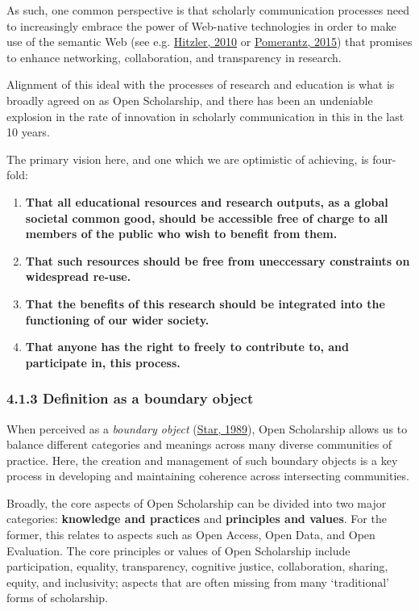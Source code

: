 As such, one common perspective is that scholarly communication
processes need to increasingly embrace the power of Web-native
technologies in order to make use of the semantic Web (see e.g.
\href{http://www.semantic-web-journal.net/content/reasonable-semantic-web}{Hitzler,
2010} or \href{https://mitpress.mit.edu/books/metadata}{Pomerantz,
2015}) that promises to enhance networking, collaboration, and
transparency in research.

Alignment of this ideal with the processes of research and education is
what is broadly agreed on as Open Scholarship, and there has been an
undeniable explosion in the rate of innovation in scholarly
communication in this in the last 10 years.

The primary vision here, and one which we are optimistic of achieving,
is four-fold:

\begin{enumerate}
\def\labelenumi{\arabic{enumi}.}
\item
  \textbf{That all educational resources and research outputs, as a
  global societal common good, should be accessible free of charge to
  all members of the public who wish to benefit from them.}
\item
  \textbf{That such resources should be free from uneccessary
  constraints on widespread re-use.}
\item
  \textbf{That the benefits of this research should be integrated into
  the functioning of our wider society.}
\item
  \textbf{That anyone has the right to freely to contribute to, and
  participate in, this process.}
\end{enumerate}

\subsubsection{4.1.3 Definition as a boundary
object}\label{definition-as-a-boundary-object}

When perceived as a \emph{boundary object}
(\href{http://www.lchc.ucsd.edu/MCA/Mail/xmcamail.2012_08.dir/pdfMrgHgzULhA.pdf}{Star,
1989}), Open Scholarship allows us to balance different categories and
meanings across many diverse communities of practice. Here, the creation
and management of such boundary objects is a key process in developing
and maintaining coherence across intersecting communities.

Broadly, the core aspects of Open Scholarship can be divided into two
major categories: \textbf{knowledge and practices} and
\textbf{principles and values}. For the former, this relates to aspects
such as Open Access, Open Data, and Open Evaluation. The core principles
or values of Open Scholarship include participation, equality,
transparency, cognitive justice, collaboration, sharing, equity, and
inclusivity; aspects that are often missing from many `traditional'
forms of scholarship.

